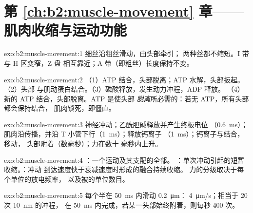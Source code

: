 \section*{第 \ref{ch:b2:muscle-movement} 章——肌肉收缩与运动功能}

\begin{solution}{exo:b2:muscle-movement:1}
细丝沿粗丝滑动，由头部牵引；
两种丝都不缩短。I 带与 H 区变窄，Z 盘
相互靠近；A 带（即粗丝）长度保持不变。
\end{solution}

\begin{solution}{exo:b2:muscle-movement:2}
（1）ATP 结合，头部脱离；ATP 水解，头部扳起。（2）头部
与肌动蛋白结合。（3）磷酸释放，发生动力冲程，ADP 释放。
（4）新的 ATP 结合，头部脱离。ATP 是使头部
\emph{脱离}所必需的：若无 ATP，所有头部都会保持结合，
肌肉锁死，即僵直。
\end{solution}

\begin{solution}{exo:b2:muscle-movement:3}
神经冲动；乙酰胆碱释放并产生终板电位
（\qty{0.6}{ms}）；肌肉沿传播，并沿
T 小管下行（\qty{1}{ms}）；释放钙离子
（\qty{1}{ms}）；钙离子与结合，移动，
头部附着（数毫秒）；力在数十
毫秒内上升。
\end{solution}

\begin{solution}{exo:b2:muscle-movement:4}
：一个运动及其支配的全部。
：单次冲动引起的短暂收缩。：冲动
到达速度快于衰减速度时形成的融合持续收缩。
力的分级取决于每个单位的放电频率，
以及被的单位数目。
\end{solution}

\begin{solution}{exo:b2:muscle-movement:5}
每个半在 \qty{50}{ms} 内滑动 \qty{0.2}{\micro m}：
\qty{4}{\micro m/s}；相当于 20 次 \qty{10}{nm} 的冲程，
在 \qty{50}{ms} 内完成，若某一头部始终附着，则每秒 400 次。
\end{solution}

